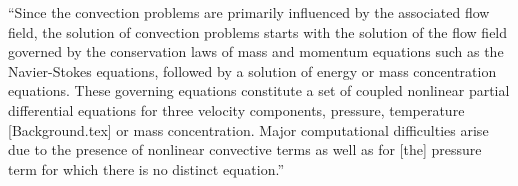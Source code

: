 
``Since the convection problems are primarily influenced by the associated flow field, the solution of convection problems starts with the solution of the flow field governed by the conservation laws of mass and momentum equations such as the Navier-Stokes equations, followed by a solution of energy or mass concentration equations.  These governing equations constitute a set of coupled nonlinear partial differential equations for three velocity components, pressure, temperature [Background.tex] or mass concentration.  Major computational difficulties arise due to the presence of nonlinear convective terms as well as for [the] pressure term for which there is no distinct equation.''\cite{Majumdar2005}